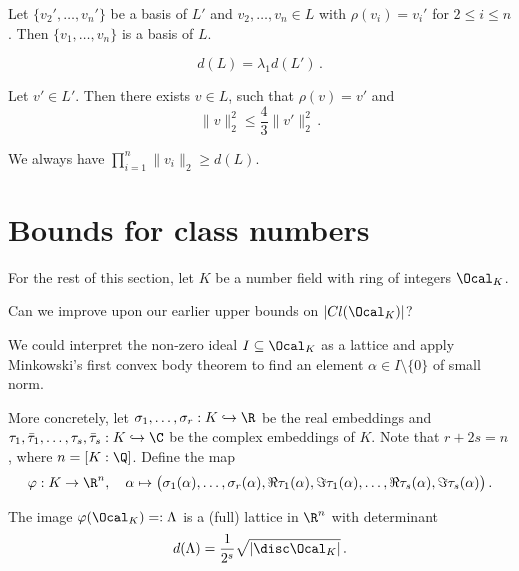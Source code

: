 \begin{lem}
	Let \( \{v_2', \dotsc, v_n'\} \) be a basis of \( L' \) and \( v_2, \dotsc, v_n \in L \) with \( \rho(v_i) = v_i' \) for \( 2 \leq i \leq n \).
	Then \( \{v_1, \dotsc, v_n\} \) is a basis of \( L \).
\end{lem}

\begin{lem}
	\[ d(L) = \lambda_1 d(L') \,. \]
\end{lem}

\begin{lem}
	Let \( v' \in L' \).
	Then there exists \( v \in L \), such that \( \rho(v) = v' \) and
	\[ \|v\|_2^2 \leq \frac{4}{3} \|v'\|_2^2 \,. \]
\end{lem}

\begin{rem*}
	We always have \( \prod_{i=1}^{n} \|v_i\|_2 \geq d(L) \).
\end{rem*}


\section{Bounds for class numbers}\label{sec:3.3}

For the rest of this section, let \( K \) be a number field with ring of integers \( \Ocal_K \).

\begin{frage*}
	Can we improve upon our earlier upper bounds on \( |Cl(\Ocal_K)| \)?
\end{frage*}

\begin{idee*}
	We could interpret the non-zero ideal \( I \subseteq \Ocal_K \) as a lattice and apply Minkowski's first convex body theorem to find an element \( \alpha \in I \setminus \{0\} \) of small norm.
\end{idee*}

More concretely, let \( \sigma_1, \dotsc, \sigma_r: K \hookrightarrow \R \) be the real embeddings and \( \tau_1, \bar{\tau}_1, \dotsc, \tau_s, \bar{\tau}_s: K \hookrightarrow \C \) be the complex embeddings of \( K \).
Note that \( r + 2s = n \), where \( n = [K:\Q] \).
Define the map 
\[ \varphi: K \to \R^n,\quad \alpha \mapsto \big( \sigma_1(\alpha), \dotsc, \sigma_r(\alpha), \Re \tau_1(\alpha), \Im \tau_1(\alpha), \dotsc, \Re \tau_s(\alpha), \Im \tau_s(\alpha) \big) \,. \]

\begin{lem}
	The image \( \varphi(\Ocal_K) =: \Lambda \) is a (full) lattice in \( \R^n \) with determinant
	\[ d(\Lambda) = \frac{1}{2^s} \sqrt{|\disc \Ocal_K|} \,. \]
\end{lem}


